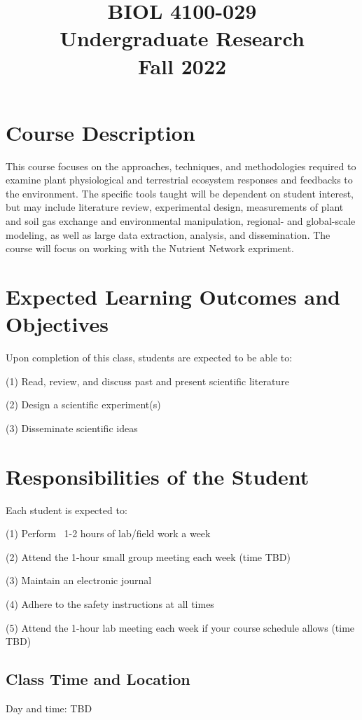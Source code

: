 \documentclass[12pt, notitlepage]{article}   	%
\title{
	\textbf{
		BIOL 4100-029
	} \\
	\large Undergraduate Research \\
	\large Fall 2022
}
\date{\vspace{-5ex}}
\begin{document}
{\selectfont %

\maketitle

\section{Course Description}
This course focuses on the approaches, techniques, and methodologies required to examine 
plant physiological and terrestrial ecosystem responses and feedbacks to the environment. 
The specific tools taught will be dependent on student interest, 
but may include literature review, experimental design, measurements of plant and soil gas 
exchange and environmental manipulation, regional- and global-scale modeling, 
as well as large data extraction, analysis, and dissemination. The course will focus on
working with the Nutrient Network expriment.

\section{Expected Learning Outcomes and Objectives}
Upon completion of this class, students are expected to be able to:\par
(1)	Read, review, and discuss past and present scientific literature\par
(2) Design a scientific experiment(s)\par
(3) Disseminate scientific ideas\par

\section{Responsibilities of the Student}
Each student is expected to:\par
(1) Perform ~1-2 hours of lab/field work a week\par
(2) Attend the 1-hour small group meeting each week (time TBD)\par
(3) Maintain an electronic journal\par
(4) Adhere to the safety instructions at all times\par
(5) Attend the 1-hour lab meeting each week if your course schedule allows (time TBD)\par

\subsection{Class Time and Location}
Day and time: TBD

}
\end{document}

